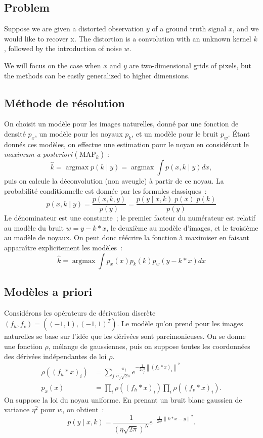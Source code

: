 \documentclass[french,a4paper]{article}
\theoremstyle{plain}
\theoremstyle{definition}
\theoremstyle{remark}
\DeclareMathOperator*{\argmax}{argmax}
\DeclareMathOperator{\MAP}{MAP}
\newcommand{\norm}[1]{\left\lVert #1 \right\rVert}
\begin{document}
\subsection{Problem}
Suppose we are given a distorted observation $y$ of a ground truth signal $x$, and we would like to recover x. The distortion is a convolution with an unknown kernel $k$, followed by the introduction of noise $w$.

We will focus on the case when $x$ and $y$ are two-dimensional grids of pixels, but the methods can be easily generalized to higher dimensions.


\subsection{Méthode de résolution}
On choisit un modèle pour les images naturelles, donné par une fonction de densité $p_x$, un modèle pour les noyaux $p_k$, et un modèle pour le bruit $p_w$.
Étant donnés ces modèles, on effectue une estimation pour le noyau en considérant le \emph{maximum a posteriori} ($\MAP_k$)~:
\[
\hat{k} = \argmax p\left( k \mid y \right) = \argmax \int p\left( x,k \mid y \right) dx,
\]
puis on calcule la déconvolution (non aveugle) à partir de ce noyau. La probabilité conditionnelle est donnée par les formules classiques~:
\[
p\left(x,k \mid y \right) = \frac{p(x,k,y)}{p(y)} = \frac{p(y \mid x,k) \; p(x) \; p(k)}{p(y)}
\]
Le dénominateur est une constante~; le premier facteur du numérateur est relatif au modèle du bruit $w = y - k*x$, le deuxième au modèle d'images, et le troisième au modèle de noyaux. On peut donc réécrire la fonction à maximiser en faisant apparaître explicitement les modèles~:
\[
\hat{k} = \argmax \int p_x(x) p_k(k) p_w(y - k*x) dx
\]

\subsection{Modèles a priori}

Considérons les opérateurs de dérivation discrète $(f_h,f_v) = ((-1,1),(-1,1)^T)$. Le modèle qu'on prend pour les images naturelles se base sur l'idée que les dérivées sont parcimonieuses. On se donne une fonction $\rho$, mélange de gaussiennes, puis on suppose toutes les coordonnées des dérivées indépendantes de loi $\rho$.
\begin{align*}
\rho((f_h*x)_i) &= \sum_j \frac{\pi_j}{\sigma_j \sqrt{2\pi}}e^{-\frac{1}{2\sigma_j^2}\norm{(f_h*x)_i}^2} \\
p_x(x) &= \prod_i \rho\left((f_h*x)_i \right) \prod_i \rho\left((f_v*x)_i\right) .
\end{align*}
On suppose la loi du noyau uniforme. En prenant un bruit blanc gaussien de variance $\eta^2$ pour $w$, on obtient~:
\[
p(y\mid x,k) = \frac{1}{(\eta\sqrt{2\pi})^N} e^{-\frac{1}{2\eta^2}\norm{k*x-y}^2} .
\]
\end{document}
